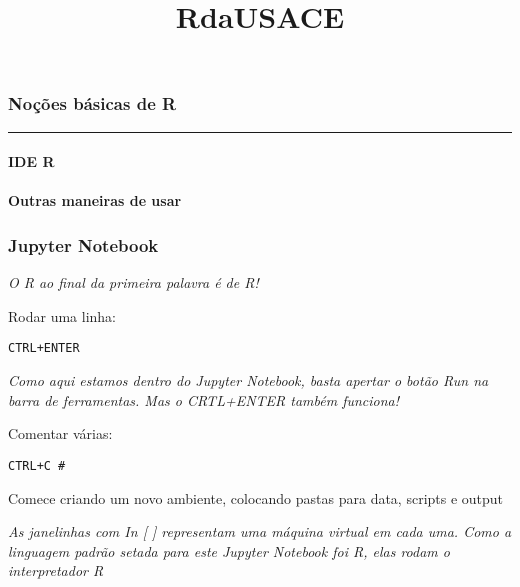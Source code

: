 \documentclass[11pt]{article}
\title{RdaUSACE}
\begin{document}
    
    
    \maketitle
    
    

    
    \hypertarget{nouxe7uxf5es-buxe1sicas-de-r}{%
\subsubsection{Noções básicas de R}\label{nouxe7uxf5es-buxe1sicas-de-r}}

\begin{center}\rule{0.5\linewidth}{\linethickness}\end{center}

\hypertarget{ide-r}{%
\paragraph{IDE R}\label{ide-r}}

\hypertarget{outras-maneiras-de-usar}{%
\paragraph{Outras maneiras de usar}\label{outras-maneiras-de-usar}}

\hypertarget{jupyter-notebook}{%
\subsubsection{Jupyter Notebook}\label{jupyter-notebook}}

\emph{O R ao final da primeira palavra é de R!}

Rodar uma linha:

\begin{verbatim}
CTRL+ENTER
\end{verbatim}

\emph{Como aqui estamos dentro do Jupyter Notebook, basta apertar o
botão Run na barra de ferramentas. Mas o CRTL+ENTER também funciona!}

Comentar várias:

\begin{verbatim}
CTRL+C #
\end{verbatim}

Comece criando um novo ambiente, colocando pastas para data, scripts e
output

\emph{As janelinhas com In {[} {]} representam uma máquina virtual em
cada uma. Como a linguagem padrão setada para este Jupyter Notebook foi
R, elas rodam o interpretador R}
\end{document}
